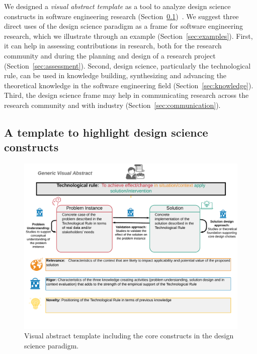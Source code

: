 \documentclass[graybox]{svmult}
\newcommand{\peggy}[1]{\textcolor{blue}{{\it [Peggy says: #1]}}}
\newcommand{\peggy}[1]{}
\begin{document}
 We designed a \emph{visual abstract template} as a tool to analyze design science constructs in software engineering research  (Section~\ref{sec:VA_template})~\cite{StoreyESEM17}. We suggest three direct uses of the design science paradigm as a frame for software engineering research, which we illustrate through an example (Section~\ref{sec:examples}). First, it can help in assessing contributions in research, both for the research community and during the planning and design of a research project (Section~\ref{sec:assessment}). Second, design science, particularly the technological rule, can be used in knowledge building, synthesizing and advancing the theoretical knowledge in the software engineering field (Section~\ref{sec:knowledge}). Third, the design science frame may help in communicating research across the research community and with industry (Section~\ref{sec:communication}). 


\subsection{A template to highlight design science constructs}%
\label{sec:VA_template}

\begin{figure}[t]
\includegraphics[width=1.0\textwidth, trim={0 15mm 0 0},clip]{Figures/GenericVA.png}
\caption{Visual abstract template including the core constructs in the design science paradigm.}
\label{fig:VA-template}      
\end{figure}
\end{document}
